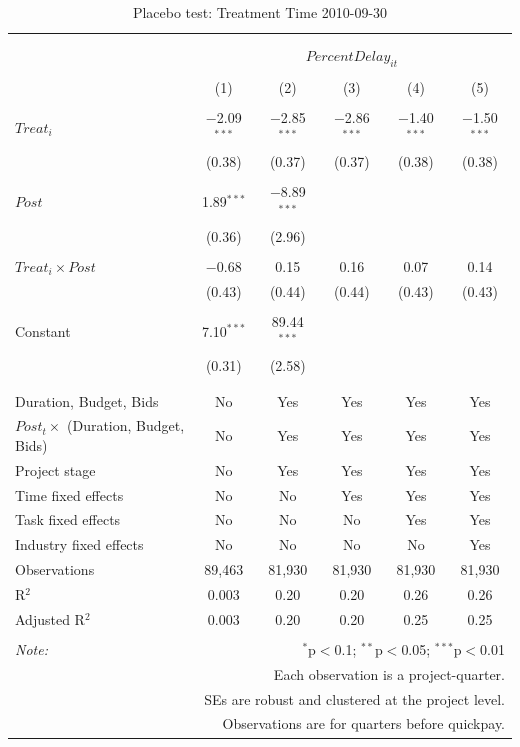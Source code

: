 \documentclass[
]{article}
\begin{document}
\begin{table}[H] \centering 
  \caption{Placebo test: Treatment Time 2010-09-30} 
  \label{} 
\small 
\begin{tabular}{@{\extracolsep{-2pt}}lccccc} 
\\[-1.8ex]\hline 
\hline \\[-1.8ex] 
\\[-1.8ex] & \multicolumn{5}{c}{$PercentDelay_{it}$} \\ 
\\[-1.8ex] & (1) & (2) & (3) & (4) & (5)\\ 
\hline \\[-1.8ex] 
 $Treat_i$ & $-$2.09$^{***}$ & $-$2.85$^{***}$ & $-$2.86$^{***}$ & $-$1.40$^{***}$ & $-$1.50$^{***}$ \\ 
  & (0.38) & (0.37) & (0.37) & (0.38) & (0.38) \\ 
  & & & & & \\ 
 $Post$ & 1.89$^{***}$ & $-$8.89$^{***}$ &  &  &  \\ 
  & (0.36) & (2.96) &  &  &  \\ 
  & & & & & \\ 
 $Treat_i \times Post$ & $-$0.68 & 0.15 & 0.16 & 0.07 & 0.14 \\ 
  & (0.43) & (0.44) & (0.44) & (0.43) & (0.43) \\ 
  & & & & & \\ 
 Constant & 7.10$^{***}$ & 89.44$^{***}$ &  &  &  \\ 
  & (0.31) & (2.58) &  &  &  \\ 
  & & & & & \\ 
\hline \\[-1.8ex] 
Duration, Budget, Bids & No & Yes & Yes & Yes & Yes \\ 
$Post_t \times$  (Duration, Budget, Bids) & No & Yes & Yes & Yes & Yes \\ 
Project stage & No & Yes & Yes & Yes & Yes \\ 
Time fixed effects & No & No & Yes & Yes & Yes \\ 
Task fixed effects & No & No & No & Yes & Yes \\ 
Industry fixed effects & No & No & No & No & Yes \\ 
Observations & 89,463 & 81,930 & 81,930 & 81,930 & 81,930 \\ 
R$^{2}$ & 0.003 & 0.20 & 0.20 & 0.26 & 0.26 \\ 
Adjusted R$^{2}$ & 0.003 & 0.20 & 0.20 & 0.25 & 0.25 \\ 
\hline 
\hline \\[-1.8ex] 
\textit{Note:}  & \multicolumn{5}{r}{$^{*}$p$<$0.1; $^{**}$p$<$0.05; $^{***}$p$<$0.01} \\ 
 & \multicolumn{5}{r}{Each observation is a project-quarter.} \\ 
 & \multicolumn{5}{r}{SEs are robust and clustered at the project level.} \\ 
 & \multicolumn{5}{r}{Observations are for quarters before quickpay.} \\ 
\end{tabular} 
\end{table}
\end{document}
